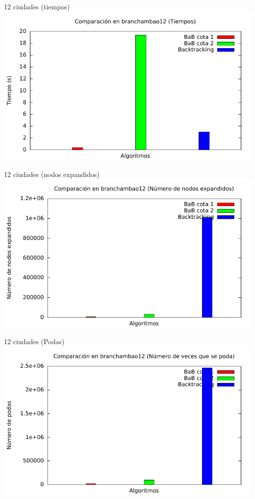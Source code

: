 \begin{frame}{12 ciudades (tiempos)}
\includegraphics[width=\textwidth]{img/barras_branchambao12_t}
\end{frame}

\begin{frame}{12 ciudades (nodos expandidos)}
\includegraphics[width=\textwidth]{img/barras_branchambao12_nodos}
\end{frame}

\begin{frame}{12 ciudades (Podas)}
\includegraphics[width=\textwidth]{img/barras_branchambao12_poda}
\end{frame}

